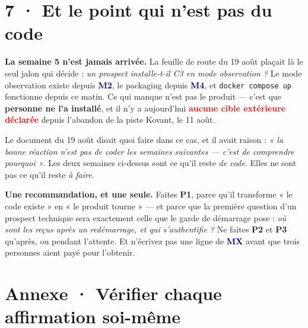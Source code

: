 \documentclass[10pt]{article}
\newcommand{\pire}[1]{\textcolor{red}{\textbf{#1}}}
\newcommand{\code}[1]{\texttt{\small #1}}
\newcommand{\mm}[1]{\textbf{\textcolor{navy}{#1}}}
\begin{document}
\section{7 · Et le point qui n'est pas du code}

\begin{alerte}
\textbf{La semaine 5 n'est jamais arrivée.} La feuille de route du 19 août plaçait là le seul jalon
qui décide : \emph{un prospect installe-t-il C3 en mode observation ?} Le mode observation existe
depuis \mm{M2}, le packaging depuis \mm{M4}, et \code{docker compose up} fonctionne depuis ce matin.
Ce qui manque n'est pas le produit --- c'est que \textbf{personne ne l'a installé}, et il n'y a
aujourd'hui \pire{aucune cible extérieure déclarée} depuis l'abandon de la piste Kovant, le 11 août.

Le document du 19 août disait quoi faire dans ce cas, et il avait raison : \emph{« la bonne réaction
n'est pas de coder les semaines suivantes --- c'est de comprendre pourquoi »}. Les deux semaines
ci-dessus sont ce qu'il reste \emph{de code}. Elles ne sont pas ce qu'il reste \emph{à faire}.
\end{alerte}

\begin{piste}
\textbf{Une recommandation, et une seule.} Faites \textbf{P1}, parce qu'il transforme « le code
existe » en « le produit tourne » --- et parce que la première question d'un prospect technique sera
exactement celle que le garde de démarrage pose : \emph{où sont les reçus après un redémarrage, et
qui s'authentifie ?} Ne faites \textbf{P2} et \textbf{P3} qu'après, ou pendant l'attente. Et
n'écrivez pas une ligne de \mm{MX} avant que trois personnes aient payé pour l'obtenir.
\end{piste}

\section{Annexe · Vérifier chaque affirmation soi-même}
\end{document}
